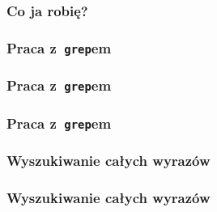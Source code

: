 \documentclass[10pt,t]{beamer}
\begin{document}
\begin{frame}
  \frametitle{Co ja robię?}



\end{frame}





\begin{frame}
  \frametitle{Praca z~\texttt{grep}em}




\end{frame}





\begin{frame}
  \frametitle{Praca z~\texttt{grep}em}



\end{frame}





\begin{frame}
  \frametitle{Praca z~\texttt{grep}em}




\end{frame}











\begin{frame}
  \frametitle{Wyszukiwanie całych wyrazów}




\end{frame}





\begin{frame}
  \frametitle{Wyszukiwanie całych wyrazów}




\end{frame}
\end{document}
